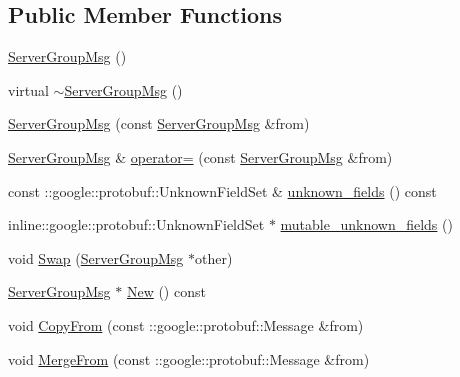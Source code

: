\subsection*{Public Member Functions}
\begin{DoxyCompactItemize}
\item 
\hyperlink{class_i_m_1_1_base_define_1_1_server_group_msg_a59f69fec0457d0365296509b4a836c86}{Server\+Group\+Msg} ()
\item 
virtual \hyperlink{class_i_m_1_1_base_define_1_1_server_group_msg_a775528d312a79a3c31d9a1373cb9cfb4}{$\sim$\+Server\+Group\+Msg} ()
\item 
\hyperlink{class_i_m_1_1_base_define_1_1_server_group_msg_a1f028a9281eb9da4be7b162d6118c14a}{Server\+Group\+Msg} (const \hyperlink{class_i_m_1_1_base_define_1_1_server_group_msg}{Server\+Group\+Msg} \&from)
\item 
\hyperlink{class_i_m_1_1_base_define_1_1_server_group_msg}{Server\+Group\+Msg} \& \hyperlink{class_i_m_1_1_base_define_1_1_server_group_msg_a2790e10594ba7bdc7d6ca91706194be2}{operator=} (const \hyperlink{class_i_m_1_1_base_define_1_1_server_group_msg}{Server\+Group\+Msg} \&from)
\item 
const \+::google\+::protobuf\+::\+Unknown\+Field\+Set \& \hyperlink{class_i_m_1_1_base_define_1_1_server_group_msg_a92714f9624baf47726ecf2b127403765}{unknown\+\_\+fields} () const 
\item 
inline\+::google\+::protobuf\+::\+Unknown\+Field\+Set $\ast$ \hyperlink{class_i_m_1_1_base_define_1_1_server_group_msg_a9442ad0dc1fa78f119e749bc4da7bb0a}{mutable\+\_\+unknown\+\_\+fields} ()
\item 
void \hyperlink{class_i_m_1_1_base_define_1_1_server_group_msg_a8fe3e2cf0258a75f2e5f1c31c17a3eb1}{Swap} (\hyperlink{class_i_m_1_1_base_define_1_1_server_group_msg}{Server\+Group\+Msg} $\ast$other)
\item 
\hyperlink{class_i_m_1_1_base_define_1_1_server_group_msg}{Server\+Group\+Msg} $\ast$ \hyperlink{class_i_m_1_1_base_define_1_1_server_group_msg_a1f206fdab6a52e7e95f3cf6e02a46367}{New} () const 
\item 
void \hyperlink{class_i_m_1_1_base_define_1_1_server_group_msg_a6fd59ffdf66246ad4d767a37fb1f7cf3}{Copy\+From} (const \+::google\+::protobuf\+::\+Message \&from)
\item 
void \hyperlink{class_i_m_1_1_base_define_1_1_server_group_msg_a94056519ec4943e185d32f2d567eb02f}{Merge\+From} (const \+::google\+::protobuf\+::\+Message \&from)
\item 

\end{DoxyCompactItemize}
